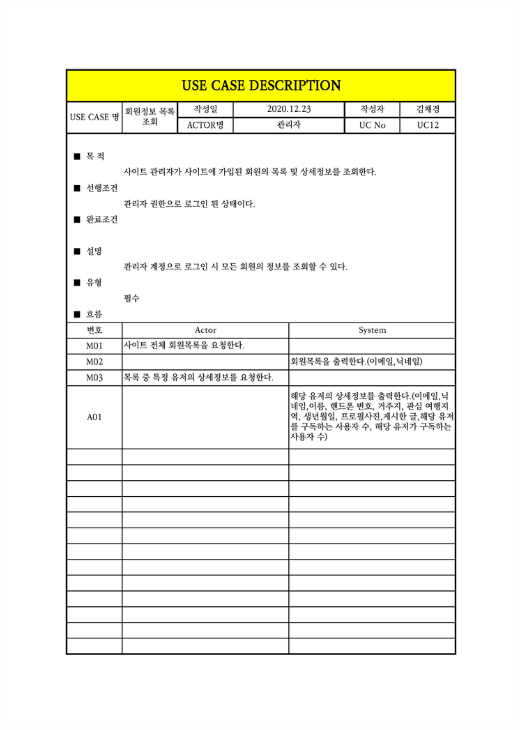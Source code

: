 {{{{{{{{{{{{{\includegraphics[width=1.1\textwidth]{./Figure/Design/Display/usecase/012.pdf} \\
}}}}}}}}}}}}}
